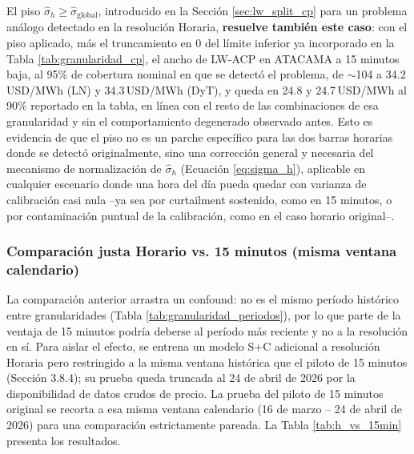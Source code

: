 El piso $\hat\sigma_h \geq \hat\sigma_{\text{global}}$, introducido en la Sección \ref{sec:lw_split_cp} para un problema análogo detectado en la resolución Horaria, \textbf{resuelve también este caso}: con el piso aplicado, más el truncamiento en 0 del límite inferior ya incorporado en la Tabla \ref{tab:granularidad_cp}, el ancho de LW-ACP en ATACAMA a 15 minutos baja, al 95\% de cobertura nominal en que se detectó el problema, de $\sim$104 a 34.2\,USD/MWh (LN) y 34.3\,USD/MWh (DyT), y queda en 24.8 y 24.7\,USD/MWh al 90\% reportado en la tabla, en línea con el resto de las combinaciones de esa granularidad y sin el comportamiento degenerado observado antes. Esto es evidencia de que el piso no es un parche específico para las dos barras horarias donde se detectó originalmente, sino una corrección general y necesaria del mecanismo de normalización de $\hat\sigma_h$ (Ecuación \eqref{eq:sigma_h}), aplicable en cualquier escenario donde una hora del día pueda quedar con varianza de calibración casi nula --ya sea por curtailment sostenido, como en 15 minutos, o por contaminación puntual de la calibración, como en el caso horario original--.

\subsubsection{Comparación justa Horario vs. 15 minutos (misma ventana calendario)}

La comparación anterior arrastra un confound: no es el mismo período histórico entre granularidades (Tabla \ref{tab:granularidad_periodos}), por lo que parte de la ventaja de 15 minutos podría deberse al período más reciente y no a la resolución en sí. Para aislar el efecto, se entrena un modelo S+C adicional a resolución Horaria pero restringido a la misma ventana histórica que el piloto de 15 minutos (Sección 3.8.4); su prueba queda truncada al 24 de abril de 2026 por la disponibilidad de datos crudos de precio. La prueba del piloto de 15 minutos original se recorta a esa misma ventana calendario (16 de marzo -- 24 de abril de 2026) para una comparación estrictamente pareada. La Tabla \ref{tab:h_vs_15min} presenta los resultados.

